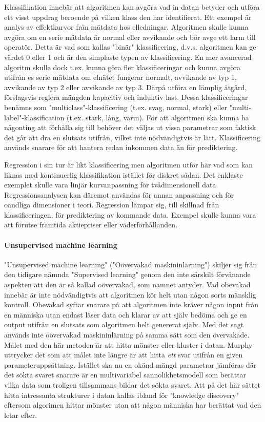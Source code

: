 \documentclass[a4paper]{article}
\begin{document}
Klassifikation innebär att algoritmen kan avgöra vad in-datan betyder och utföra ett visst uppdrag beroende på vilken klass den har identifierat. Ett exempel är analys av effektkurvor från mätdata hos elledningar. Algoritmen skulle kunna avgöra om en serie mätdata är normal eller avvikande och bör avge ett larm till operatör. Detta är vad som kallas "binär" klassificering, d.v.s. algoritmen kan ge värdet 0 eller 1 och är den simplaste typen av klassificering. En mer avancerad algoritm skulle dock t.ex. kunna göra fler klassificeringar och kunna avgöra utifrån es serie mätdata om elnätet fungerar normalt, avvikande av typ 1, avvikande av typ 2 eller avvikande av typ 3. Därpå utföra en lämplig åtgärd, förslagsvis reglera mängden kapacitiv och induktiv last. Dessa klassificeringar benämns som "multiclass"-klassificering (t.ex. svag, normal, stark) eller "multi-label"-klassification (t.ex. stark, lång, varm). För att algoritmen ska kunna ha någonting att förhålla sig till behöver det väljas ut vissa parametrar som faktisk det går att dra en slutsats utifrån, vilket inte nödvändigtvis är lätt. Klassificering används snarare för att hantera redan inkommen data än för prediktering.

Regression i sin tur är likt klassificering men algoritmen utför här vad som kan liknas med kontinuerlig klassifikation istället för diskret sådan. Det enklaste exemplet skulle vara linjär kurvanpassning för tvådimensionell data. Regressionsanalysen kan däremot användas för annan anpassning och för oändliga dimensioner i teori. Regression lämpar sig, till skillnad från klassificeringen, för prediktering av kommande data. Exempel skulle kunna vara att förutse framtida aktiepriser eller väderförhållanden.


\paragraph{Unsupervised machine learning}

"Unsupervised machine learning" ("Oövervakad maskininlärning") skiljer sig från den tidigare nämnda "Supervised learning" genom den inte särskilt förvånande aspekten att den är så kallad oövervakad, som namnet antyder. Vad obevakad innebär är inte nödvändigtvis att algoritmen kör helt utan någon sorts mänsklig kontroll. Obevakad syftar snarare på att algoritmen inte kräver någon input från en människa utan endast läser data och klarar av att själv bedöma och ge en output utifrån en slutsats som algoritmen helt genererat själv. Med det sagt används inte oövervakad maskininlärning på samma sätt som den övervakade. Målet med den här metoden är att hitta mönster eller kluster i datan. Murphy uttrycker det som att målet inte längre är att hitta \emph{ett} svar utifrån en given parameteruppsättning. Istället ska nu en okänd mängd parametrar jämföras där det sökta svaret snarare är en multivariabel sannolikhetsmodell som berättar vilka data som troligen tillsammans bildar det sökta svaret. Att på det här sättet hitta intressanta strukturer i datan kallas ibland för "knowledge discovery" eftersom algorimen hittar mönster utan att någon människa har berättat vad den letar efter.
\end{document}
